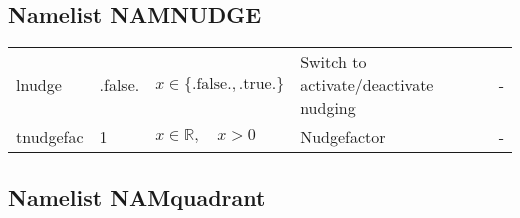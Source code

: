 \documentclass[twoside,11pt,fleqn,a4paper,english,openright]{report}
\begin{document}
\subsection{Namelist NAMNUDGE}\label{par:nudge}
\begin{center}
  \tablelasttail{
        &&&&\\\hline
  }
\begin{supertabular}{|l|p{1.6cm}|p{4cm}|p{6.5cm}|l|}
lnudge	& .false.	& $x\in\{\text{.false.},\text{.true.}\}$	& Switch to activate/deactivate nudging	& -\\
tnudgefac & 1	& $x \in \mathbb{R}, \quad x>0$	&	Nudgefactor & -\\
\end{supertabular}
\end{center}




\subsection{Namelist NAMquadrant}\label{par:quadrant}
\end{document}
